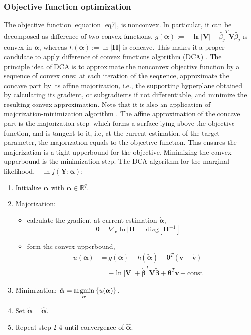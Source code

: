 \subsubsection{Objective function optimization} \label{DCA}
The objective function, equation \eqref{eq7}, is nonconvex. In particular, it can be decomposed as difference of two convex functions. $g(\bm{\alpha}):=-\ln{|\bm{V}|} + \widetilde{\beta_j}^T\bm{V}\widetilde{\beta_j}$ is convex in $\bm{\alpha}$, whereas $h(\bm{\alpha}):=\ln{|\bm{H}|}$ is concave. This makes it a proper candidate to apply difference of convex functions algorithm (DCA) \citep{le2015dc}. The principle idea of DCA is to approximate the nonconvex objective function by a sequence of convex ones: at each iteration of the sequence, approximate the concave part by its affine majorization, i.e., the supporting hyperplane obtained by calculating its gradient, or subgradients if not differentiable, and minimize the resulting convex approximation. Note that it is also an application of majorization-minimization algorithm \citep{hunter2004tutorial}. The affine approximation of the concave part is the majorization step, which forms a surface lying above the objective function, and is tangent to it, i.e, at the current estimation of the target parameter, the majorization equals to the objective function. This ensures the majorization is a tight upperbound for the objective. Minimizing the convex upperbound is the minimization step. The DCA algorithm for the marginal likelihood, $-\ln{f(\bm{Y};\bm{\alpha})}$:
\begin{enumerate}
    \item Initialize $\bm{\alpha}$ with $\widetilde{\bm{\alpha}} \in \mathbb{R}^q$.
    \item Majorization: 
    \begin{itemize}
        \item calculate the gradient at current estimation $\widetilde{\bm{\alpha}}$,
    $$\bm{\theta}= \nabla_{\bm{v}} \ln{|\bm{H}|} = \text{diag}[\bm{H}^{-1}]$$ 
        \item form the convex upperbound,
        \begin{align*}
        u(\bm{\alpha})&=g(\bm{\alpha})+ h(\widetilde{\bm{\alpha}}) + \bm{\theta}^T(\bm{v}-\widetilde{\bm{v}}) \\
        &=-\ln{|\bm{V}|} + \widetilde{\bm{\beta}}^T\bm{V}\widetilde{\bm{\beta}}+\bm{\theta}^T\bm{v}+\text{const}
        \end{align*}
    \end{itemize}
    \item Minimization: $\hat{\bm{\alpha}}=\underset{\bm{\alpha}}{\operatorname{\operatorname*{argmin}}} \left\{u(\bm{\alpha})\right\}$.
    \item Set $\widetilde{\bm{\alpha}} = \hat{\bm{\alpha}}$.
    \item Repeat step 2-4 until convergence of $\hat{\bm{\alpha}}$.
\end{enumerate}
